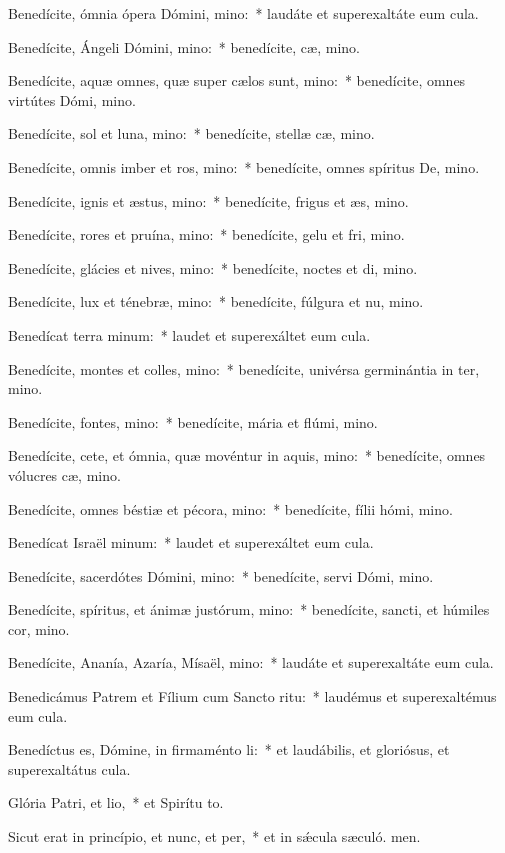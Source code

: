 \item Benedícite, ómnia ópera Dómini, mino:~* laudáte et superexaltáte eum  cula.
\item Benedícite, Ángeli Dómini, mino:~* benedícite, cæ, mino.
\item Benedícite, aquæ omnes, quæ super cælos sunt, mino:~* benedícite, omnes virtútes Dómi, mino.
\item Benedícite, sol et luna, mino:~* benedícite, stellæ cæ, mino.
\item Benedícite, omnis imber et ros, mino:~* benedícite, omnes spíritus De, mino.
\item Benedícite, ignis et æstus, mino:~* benedícite, frigus et æs, mino.
\item Benedícite, rores et pruína, mino:~* benedícite, gelu et fri, mino.
\item Benedícite, glácies et nives, mino:~* benedícite, noctes et di, mino.
\item Benedícite, lux et ténebræ, mino:~* benedícite, fúlgura et nu, mino.
\item Benedícat terra minum:~* laudet et superexáltet eum  cula.
\item Benedícite, montes et colles, mino:~* benedícite, univérsa germinántia in ter, mino.
\item Benedícite, fontes, mino:~* benedícite, mária et flúmi, mino.
\item Benedícite, cete, et ómnia, quæ movéntur in aquis, mino:~* benedícite, omnes vólucres cæ, mino.
\item Benedícite, omnes béstiæ et pécora, mino:~* benedícite, fílii hómi, mino.
\item Benedícat Israël minum:~* laudet et superexáltet eum  cula.
\item Benedícite, sacerdótes Dómini, mino:~* benedícite, servi Dómi, mino.
\item Benedícite, spíritus, et ánimæ justórum, mino:~* benedícite, sancti, et húmiles cor, mino.
\item Benedícite, Ananía, Azaría, Mísaël, mino:~* laudáte et superexaltáte eum  cula.
\item Benedicámus Patrem et Fílium cum Sancto ritu:~* laudémus et superexaltémus eum  cula.
\item Benedíctus es, Dómine, in firmaménto li:~* et laudábilis, et gloriósus, et superexaltátus  cula.
\item Glória Patri, et lio,~* et Spirítu to.
\item Sicut erat in princípio, et nunc, et per,~* et in sǽcula sæculó. men.
